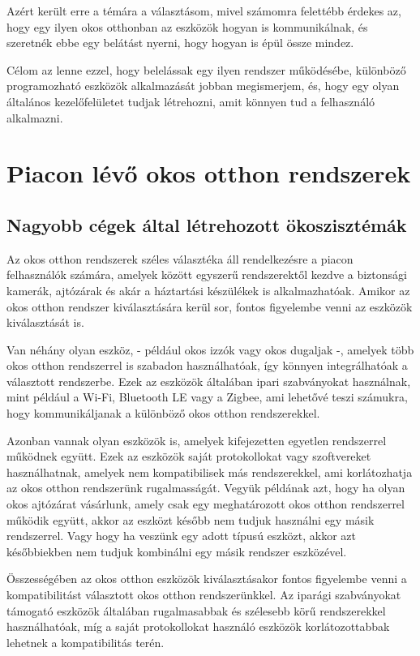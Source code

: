 \documentclass[
]{thesis-ekf}
\theoremstyle{definition}
\theoremstyle{remark}
\begin{document}
	Azért került erre a témára a választásom, mivel számomra felettébb érdekes az, hogy egy ilyen okos otthonban az eszközök hogyan is kommunikálnak, és szeretnék ebbe egy belátást nyerni, hogy hogyan is épül össze mindez.

	Célom az lenne ezzel, hogy belelássak egy ilyen rendszer működésébe, különböző programozható eszközök alkalmazását jobban megismerjem, és, hogy egy olyan általános kezelőfelületet tudjak létrehozni, amit könnyen tud a felhasználó alkalmazni.
	
	\chapter{Piacon lévő okos otthon rendszerek}
	\section{Nagyobb cégek által létrehozott ökoszisztémák}
		Az okos otthon rendszerek széles választéka áll rendelkezésre a piacon felhasználók számára, amelyek között egyszerű rendszerektől kezdve a biztonsági kamerák, ajtózárak és akár a háztartási készülékek is alkalmazhatóak. Amikor az okos otthon rendszer kiválasztására kerül sor, fontos figyelembe venni az eszközök kiválasztását is.
		
		Van néhány olyan eszköz, - például okos izzók vagy okos dugaljak -, amelyek több okos otthon rendszerrel is szabadon használhatóak, így könnyen integrálhatóak a választott rendszerbe. Ezek az eszközök általában ipari szabványokat használnak, mint például a Wi-Fi, Bluetooth LE vagy a Zigbee, ami lehetővé teszi számukra, hogy kommunikáljanak a különböző okos otthon rendszerekkel.
		
		Azonban vannak olyan eszközök is, amelyek kifejezetten egyetlen rendszerrel működnek együtt. Ezek az eszközök saját protokollokat vagy szoftvereket használhatnak, amelyek nem kompatibilisek más rendszerekkel, ami korlátozhatja az okos otthon rendszerünk rugalmasságát. Vegyük példának azt, hogy ha olyan okos ajtózárat vásárlunk, amely csak egy meghatározott okos otthon rendszerrel működik együtt, akkor az eszközt később nem tudjuk használni egy másik rendszerrel. Vagy hogy ha veszünk egy adott típusú eszközt, akkor azt későbbiekben nem tudjuk kombinálni egy másik rendszer eszközével.
		
		Összességében az okos otthon eszközök kiválasztásakor fontos figyelembe venni a kompatibilitást választott okos otthon rendszerünkkel. Az iparági szabványokat támogató eszközök általában rugalmasabbak és szélesebb körű rendszerekkel használhatóak, míg a saját protokollokat használó eszközök korlátozottabbak lehetnek a kompatibilitás terén.
		
\end{document}
